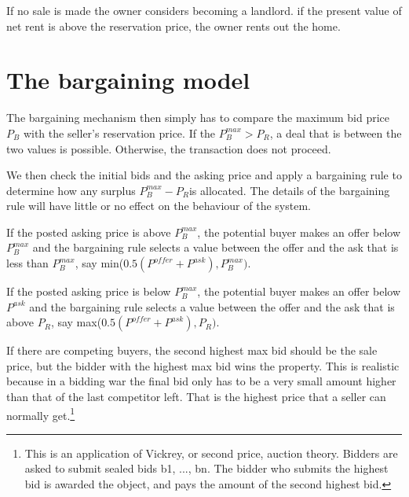 If no sale is made the owner considers becoming a landlord. if the present value of net rent is above the reservation price, the owner rents out the home. 


\section{The bargaining model}\label{sec-bargaining}
The bargaining  mechanism then simply has to compare the maximum bid price  $P_B$ with the seller's reservation price. If the $P_B^{max}>P_R$, a deal that is between the two values is possible. Otherwise, the transaction does not proceed.

We then check the initial bids and the asking price and apply a bargaining rule to determine how any surplus $P_B^{max}-P_R$is allocated. The details of the bargaining rule will have little or no effect on the  behaviour of the system. 

If the posted asking price is above $P_B^{max}$, the potential buyer  makes an offer below $P_B^{max}$ and the bargaining rule selects a value between the offer and the ask that is less than $P_B^{max}$, say min($0.5(P^{offer}+P^{ask}), P_B^{max})$.

If the posted asking price is below $P_B^{max}$, the potential buyer  makes an offer below $P^{ask}$ and the bargaining rule selects a value between the offer and the ask that is above $P_R$, say max($0.5(P^{offer}+P^{ask}), P_R)$. 

If there  are competing buyers, the second highest max bid should be the sale price, but the bidder with the highest max bid wins the property. This is realistic because in a bidding war the final bid only has to be a very small amount higher than that of the last competitor left.  That is the highest price that a seller can normally get.\footnote{This is an application of Vickrey, or second price, auction theory. Bidders are asked to submit sealed bids b1, ..., bn. The bidder who submits the highest bid is awarded the object, and pays the amount of the second highest bid.\cite{levinAuctionTheory2004} }

 







